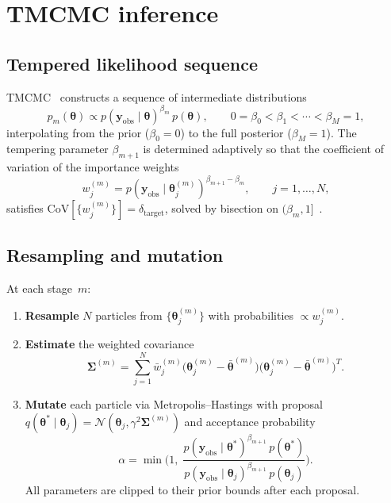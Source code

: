 \documentclass[11pt,a4paper]{article}
\newcommand{\btheta}{\boldsymbol{\theta}}
\newcommand{\yobs}{\mathbf{y}_{\mathrm{obs}}}
\begin{document}
\section{TMCMC inference}
\label{sec:tmcmc}

\subsection{Tempered likelihood sequence}

TMCMC~\cite{ChingChen2007TMCMC, DelMoral2006SMC, Chopin2002SMC} constructs a sequence of intermediate distributions
\begin{equation}
p_m(\btheta) \propto p(\yobs\mid\btheta)^{\beta_m}\,p(\btheta),
\qquad
0=\beta_0<\beta_1<\cdots<\beta_M=1,
\label{eq:tempered}
\end{equation}
interpolating from the prior ($\beta_0=0$) to the full posterior ($\beta_M=1$).
The tempering parameter $\beta_{m+1}$ is determined adaptively so that the coefficient of variation of the importance weights
\begin{equation}
w_j^{(m)} = p(\yobs\mid\btheta_j^{(m)})^{\beta_{m+1}-\beta_m},
\qquad j=1,\dots,N,
\label{eq:weights}
\end{equation}
satisfies $\mathrm{CoV}[\{w_j^{(m)}\}]=\delta_{\mathrm{target}}$, solved by bisection on $(\beta_m,1]$~\cite{Betz2016TMCMC}.

\subsection{Resampling and mutation}

At each stage~$m$:
\begin{enumerate}[nosep,leftmargin=*]
\item \textbf{Resample} $N$ particles from $\{\btheta_j^{(m)}\}$ with probabilities $\propto w_j^{(m)}$.
\item \textbf{Estimate} the weighted covariance
\begin{equation}
\boldsymbol{\Sigma}^{(m)}
= \sum_{j=1}^{N}\bar{w}_j^{(m)}
\bigl(\btheta_j^{(m)}-\bar{\btheta}^{(m)}\bigr)
\bigl(\btheta_j^{(m)}-\bar{\btheta}^{(m)}\bigr)^T.
\label{eq:cov}
\end{equation}
\item \textbf{Mutate} each particle via Metropolis--Hastings with proposal $q(\btheta^*\mid\btheta_j)=\mathcal{N}(\btheta_j,\gamma^2\boldsymbol{\Sigma}^{(m)})$ and acceptance probability
\begin{equation}
\alpha = \min\!\biggl(1,\;
\frac{p(\yobs\mid\btheta^*)^{\beta_{m+1}}\,p(\btheta^*)}
     {p(\yobs\mid\btheta_j)^{\beta_{m+1}}\,p(\btheta_j)}\biggr).
\label{eq:accept}
\end{equation}
All parameters are clipped to their prior bounds after each proposal.
\end{enumerate}
\end{document}
